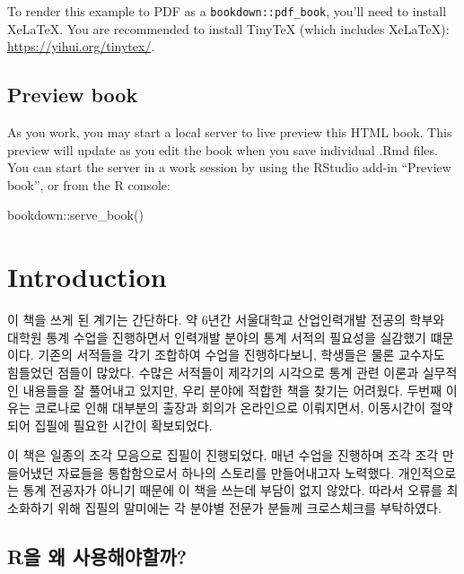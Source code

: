 \documentclass[
]{book}
\newenvironment{Shaded}{\begin{snugshade}}{\end{snugshade}}
\newcommand{\FunctionTok}[1]{\textcolor[rgb]{0.00,0.00,0.00}{#1}}
\newcommand{\NormalTok}[1]{#1}
\newcommand{\SpecialCharTok}[1]{\textcolor[rgb]{0.00,0.00,0.00}{#1}}
\theoremstyle{definition}
\theoremstyle{definition}
\theoremstyle{definition}
\theoremstyle{definition}
\theoremstyle{remark}
\begin{document}
To render this example to PDF as a \texttt{bookdown::pdf\_book}, you'll need to install XeLaTeX. You are recommended to install TinyTeX (which includes XeLaTeX): \url{https://yihui.org/tinytex/}.

\hypertarget{preview-book}{%
\section{Preview book}\label{preview-book}}

As you work, you may start a local server to live preview this HTML book. This preview will update as you edit the book when you save individual .Rmd files. You can start the server in a work session by using the RStudio add-in ``Preview book'', or from the R console:

\begin{Shaded}
\begin{Highlighting}[]
\NormalTok{bookdown}\SpecialCharTok{::}\FunctionTok{serve\_book}\NormalTok{()}
\end{Highlighting}
\end{Shaded}

\mainmatter

\hypertarget{intro}{%
\chapter{Introduction}\label{intro}}

이 책을 쓰게 된 계기는 간단하다. 약 6년간 서울대학교 산업인력개발 전공의 학부와 대학원 통계 수업을 진행하면서 인력개발 분야의 통계 서적의 필요성을 실감했기 떄문이다. 기존의 서적들을 각기 조합하여 수업을 진행하다보니, 학생들은 물론 교수자도 힘들었던 점들이 많았다. 수많은 서적들이 제각기의 시각으로 통계 관련 이론과 실무적인 내용들을 잘 풀어내고 있지만, 우리 분야에 적합한 책을 찾기는 어려웠다. 두번째 이유는 코로나로 인해 대부분의 출장과 회의가 온라인으로 이뤄지면서, 이동시간이 절약되어 집필에 필요한 시간이 확보되었다.

이 책은 일종의 조각 모음으로 집필이 진행되었다. 매년 수업을 진행하며 조각 조각 만들어냈던 자료들을 통합함으로서 하나의 스토리를 만들어내고자 노력했다. 개인적으로는 통계 전공자가 아니기 때문에 이 책을 쓰는데 부담이 없지 않았다. 따라서 오류를 최소화하기 위해 집필의 말미에는 각 분야별 전문가 분들께 크로스체크를 부탁하였다.

\hypertarget{ruxc744-uxc65c-uxc0acuxc6a9uxd574uxc57cuxd560uxae4c}{%
\section{R을 왜 사용해야할까?}\label{ruxc744-uxc65c-uxc0acuxc6a9uxd574uxc57cuxd560uxae4c}}
\end{document}
